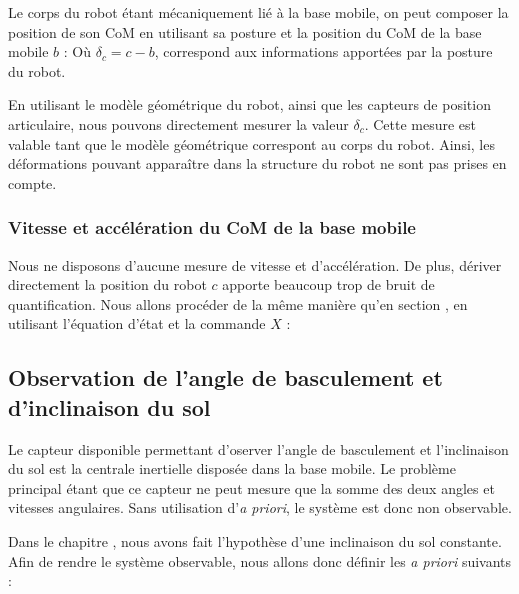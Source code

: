 				Le corps du robot étant mécaniquement lié à la base mobile, on peut composer la position de son CoM en utilisant sa posture et la position du CoM de la base mobile $b$ :
				Où $\delta_c = c-b$, correspond aux informations apportées par la posture du robot.
				
				En utilisant le modèle géométrique du robot, ainsi que les capteurs de position articulaire, nous pouvons directement mesurer la valeur $\delta_c$.
				Cette mesure est valable tant que le modèle géométrique correspont au corps du robot. Ainsi, les déformations pouvant apparaître dans la structure du robot ne sont pas prises en compte.
		
			\subsubsection{Vitesse et accélération du CoM de la base mobile}
			
				Nous ne disposons d'aucune mesure de vitesse et d'accélération. 
				De plus, dériver directement la position du robot $c$ apporte beaucoup trop de bruit de quantification.
				Nous allons procéder de la même manière qu'en section , en utilisant l'équation d'état  et la commande $X$ :
				
			
		\subsection{Observation de l'angle de basculement et d'inclinaison du sol}
		\label{section.mesure_tilt_pente}
		
			Le capteur disponible permettant d'oserver l'angle de basculement et l'inclinaison du sol est la centrale inertielle disposée dans la base mobile.
			Le problème principal étant que ce capteur ne peut mesure que la somme des deux angles et vitesses angulaires.
			Sans utilisation d'\textit{a priori}, le système est donc non observable.
			
			Dans le chapitre , nous avons fait l'hypothèse d'une inclinaison du sol constante.
			Afin de rendre le système observable, nous allons donc définir les \textit{a priori} suivants :
			
